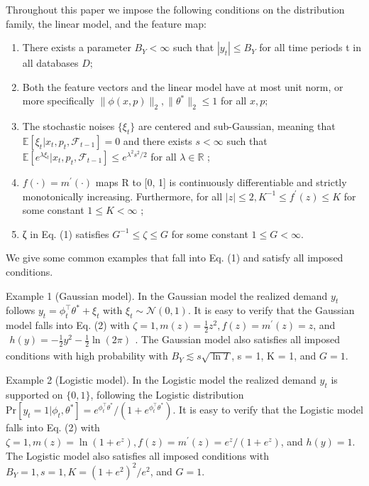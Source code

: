 Throughout this paper we impose the following conditions on the distribution family, the linear model, and the feature map:

\begin{enumerate}
\def\labelenumi{\arabic{enumi}.}
\item
  There exists a parameter \(B _ { Y } < \infty\) such that \(| y _ { t } | \le B _ { Y }\) for all time periods t in all databases \(D ;\)
\item
  Both the feature vectors and the linear model have at most unit norm, or more specifically \(\| \phi ( x , p ) \| _ { 2 } , \| \theta ^ { * } \| _ { 2 } \leq 1\) for all \(x , p ;\)
\item
  The stochastic noises \(\{ \xi _ { t } \}\) are centered and sub-Gaussian, meaning that \(\mathbb { E } [ \xi _ { t } | x _ { t } , p _ { t } , \mathcal { F } _ { t - 1 } ] = 0\) and there exists \(s < \infty\) such that \(\mathbb { E } [ e ^ { \lambda \xi _ { t } } | x _ { t } , p _ { t } , \mathcal { F } _ { t - 1 } ] \le e ^ { \lambda ^ { 2 } s ^ { 2 } / 2 }\) for all \(\lambda \in \mathbb { R }\) ;
\item
  \(f ( \cdot ) = m ^ { \prime } ( \cdot )\) maps R to {[}0, 1{]} is continuously differentiable and strictly monotonically increasing. Furthermore, for all \(| z | \leq 2 , K ^ { - 1 } \leq f ^ { \prime } ( z ) \leq K\) for some constant \(1 \le K < \infty\) ;
\item
  ζ in Eq. (1) satisfies \(G ^ { - 1 } \leq \zeta \leq G\) for some constant \(1 \leq G < \infty\).
\end{enumerate}

We give some common examples that fall into Eq. (1) and satisfy all imposed conditions.

Example 1 (Gaussian model). In the Gaussian model the realized demand \(y _ { t }\) follows \(y _ { t } = \phi _ { t } ^ { \top } \theta ^ { * } + \xi _ { t }\) with \(\xi _ { t } \sim \mathcal { N } ( 0 , 1 )\). It is easy to verify that the Gaussian model falls into Eq. (2) with \(\zeta = 1 , m ( z ) = \textstyle { \frac { 1 } { 2 } } z ^ { 2 } , f ( z ) = m ^ { \prime } ( z ) = z\), and \(\begin{array} { r } { h ( y ) = - \frac { 1 } { 2 } y ^ { 2 } - \frac { 1 } { 2 } \ln ( 2 \pi ) } \end{array}\). The Gaussian model also satisfies all imposed conditions with high probability with \(B _ { Y } \lesssim s \sqrt { \ln T }\), s = 1, K = 1, and \(G = 1\).

Example 2 (Logistic model). In the Logistic model the realized demand \(y _ { t }\) is supported on \(\{ 0 , 1 \}\), following the Logistic distribution \(\mathrm { P r } [ y _ { t } = 1 | \phi _ { t } , \theta ^ { * } ] = e ^ { \phi _ { t } ^ { \top } \theta ^ { * } } / ( 1 + e ^ { \phi _ { t } ^ { \top } \theta ^ { * } } )\). It is easy to verify that the Logistic model falls into Eq. (2) with \(\zeta = 1 , m ( z ) = \ln ( 1 + e ^ { z } ) , f ( z ) = m ^ { \prime } ( z ) = e ^ { z } / ( 1 + e ^ { z } )\), and \(h ( y ) = 1\). The Logistic model also satisfies all imposed conditions with \(B _ { Y } = 1 , s = 1 , K = ( 1 + e ^ { 2 } ) ^ { 2 } / e ^ { 2 }\), and \(G = 1\).

